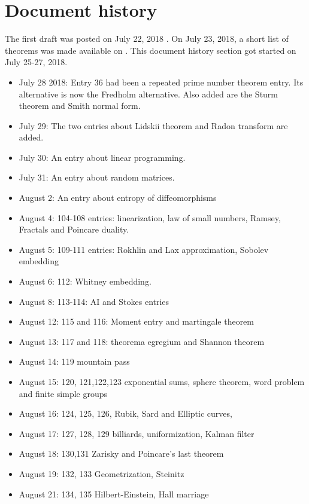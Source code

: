 \documentclass[12pt]{amsart}
\begin{document}
\pagebreak

\section{Document history}

The first draft was posted on July 22, 2018 \cite{FundamentalTheorems}.
On July 23, 2018, a short list of theorems was made available on 
\cite{Top10FundamentalTheorems}.
This document history section got started on July 25-27, 2018. 

\begin{tiny}
\begin{itemize}
\item July 28 2018: Entry 36 had been a repeated prime number theorem entry. Its alternative is now the Fredholm alternative.
      Also added are the Sturm theorem and Smith normal form.
\item July 29: The two entries about Lidskii theorem and Radon transform are added.
\item July 30: An entry about linear programming.
\item July 31: An entry about random matrices.
\item August 2: An entry about entropy of diffeomorphisms
\item August 4: 104-108 entries: linearization, law of small numbers, Ramsey, Fractals and Poincare duality. 
\item August 5: 109-111 entries: Rokhlin and Lax approximation, Sobolev embedding
\item August 6: 112: Whitney embedding.
\item August 8: 113-114: AI and Stokes entries
\item August 12: 115 and 116: Moment entry  and martingale theorem
\item August 13: 117 and 118: theorema egregium and Shannon theorem
\item August 14: 119 mountain pass
\item August 15: 120, 121,122,123 exponential sums, sphere theorem, word problem and finite simple groups
\item August 16: 124, 125, 126, Rubik, Sard and Elliptic curves, 
\item August 17: 127, 128, 129 billiards, uniformization, Kalman filter
\item August 18: 130,131 Zarisky and Poincare's last theorem
\item August 19: 132, 133 Geometrization, Steinitz
\item August 21: 134, 135 Hilbert-Einstein, Hall marriage

\end{itemize}
\end{tiny}
\end{document}
